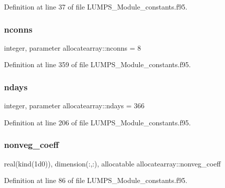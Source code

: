 Definition at line 37 of file L\+U\+M\+P\+S\+\_\+\+Module\+\_\+constants.\+f95.

\mbox{\label{namespaceallocatearray_a420c0415ef0d070ce0b1c598ace0b0a4}} 
\subsubsection{\texorpdfstring{nconns}{nconns}}
{\footnotesize\ttfamily integer, parameter allocatearray\+::nconns = 8}



Definition at line 359 of file L\+U\+M\+P\+S\+\_\+\+Module\+\_\+constants.\+f95.

\mbox{\label{namespaceallocatearray_ad1f75258d3afd41ea7c941d35561665b}} 
\subsubsection{\texorpdfstring{ndays}{ndays}}
{\footnotesize\ttfamily integer, parameter allocatearray\+::ndays = 366}



Definition at line 206 of file L\+U\+M\+P\+S\+\_\+\+Module\+\_\+constants.\+f95.

\mbox{\label{namespaceallocatearray_a3bc78607c50c9b5b7ce41298703bb51a}} 
\subsubsection{\texorpdfstring{nonveg\+\_\+coeff}{nonveg\_coeff}}
{\footnotesize\ttfamily real(kind(1d0)), dimension(\+:,\+:), allocatable allocatearray\+::nonveg\+\_\+coeff}



Definition at line 86 of file L\+U\+M\+P\+S\+\_\+\+Module\+\_\+constants.\+f95.

\mbox{\label{namespaceallocatearray_acd22f92a06f7e9a2a91426b3dc99fdb0}} 
